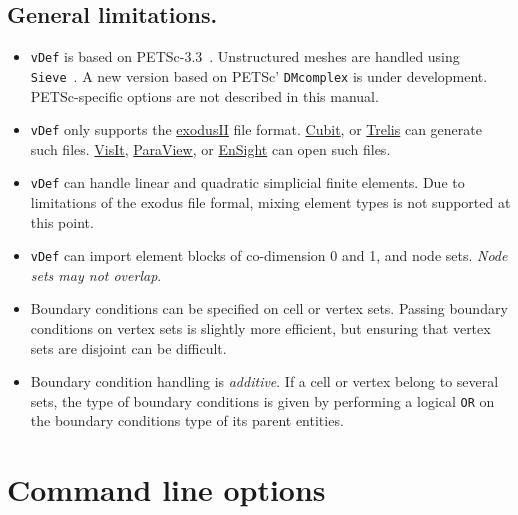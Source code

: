 \documentclass[10pt,oneside]{memoir}
\def\vDef{{\texttt{vDef}} }
\begin{document}
\section{General limitations.}
\begin{itemize}
\item \vDef is based on PETSc-3.3~\cite{petsc-efficient,petsc-user-ref,petsc-web-page}. Unstructured meshes are handled using \texttt{Sieve}~\cite{Knepley-Karpeev-2009a}. A new version based on PETSc' \texttt{DMcomplex} is under development. PETSc-specific options are not described in this manual.
\item \vDef only supports the \href{http://sourceforge.net/projects/exodusii/}{exodusII} file format. \href{http://cubit.sandia.gov}{Cubit}, or \href{http://www.csimsoft.com/trelis.jsp}{Trelis} can generate such files. \href{https://wci.llnl.gov/codes/visit/}{VisIt}, \href{http://paraview.org}{ParaView}, or \href{http://www.ceisoftware.com}{EnSight} can open such files.
\item \vDef can handle linear and quadratic simplicial finite elements. Due to limitations of the exodus file formal, mixing element types is not supported at this point.
\item \vDef can import element blocks of co-dimension 0 and 1, and node sets. \emph{Node sets may not overlap}.
\item Boundary conditions can be specified on cell or vertex sets. Passing boundary conditions on vertex sets is slightly more efficient, but ensuring that vertex sets are disjoint can be difficult.
\item Boundary condition handling is \emph{additive}. If a cell or vertex belong to several sets, the type of boundary conditions is given by performing a logical \verb+OR+ on the boundary conditions type of its parent entities. 
\end{itemize}

\chapter{Command line options}
\end{document}
